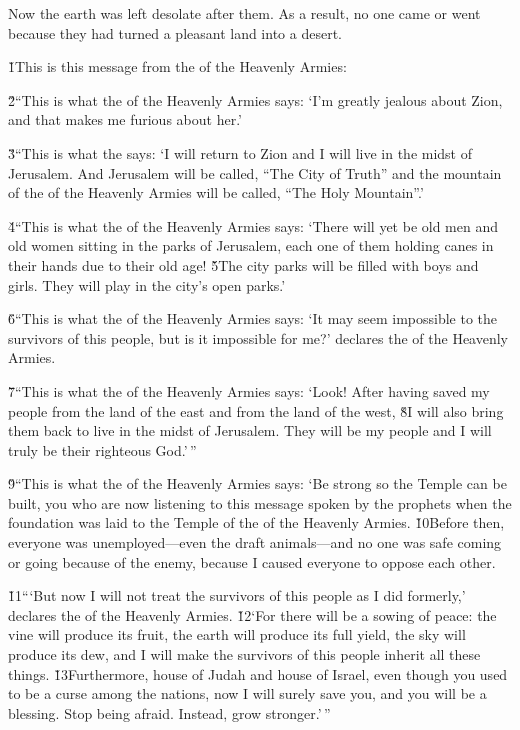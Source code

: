 Now the earth was left desolate after them. As a result, no one came or went because they had turned a pleasant land into a desert.

\v{1}This is this message from the  of the Heavenly Armies:

\v{2}``This is what the  of the Heavenly Armies says: `I'm greatly jealous about Zion, and that makes me furious about her.'

\v{3}``This is what the  says: `I will return to Zion and I will live in the midst of Jerusalem. And Jerusalem will be called, ``The City of Truth'' and the mountain of the  of the Heavenly Armies will be called, ``The Holy Mountain''.'

\v{4}``This is what the  of the Heavenly Armies says: `There will yet be old men and old women sitting in the parks of Jerusalem, each one of them holding canes in their hands due to their old age! \v{5}The city parks will be filled with boys and girls. They will play in the city's open parks.'

\v{6}``This is what the  of the Heavenly Armies says: `It may seem impossible to the survivors of this people, but is it impossible for me?' declares the  of the Heavenly Armies.

\v{7}``This is what the  of the Heavenly Armies says: `Look! After having saved my people from the land of the east and from the land of the west, \v{8}I will also bring them back to live in the midst of Jerusalem. They will be my people and I will truly be their righteous God.'\,''

\v{9}``This is what the  of the Heavenly Armies says: `Be strong so the Temple can be built, you who are now listening to this message spoken by the prophets when the foundation was laid to the Temple of the  of the Heavenly Armies. \v{10}Before then, everyone was unemployed---even the draft animals---and no one was safe coming or going because of the enemy, because I caused everyone to oppose each other.

\v{11}```But now I will not treat the survivors of this people as I did formerly,' declares the  of the Heavenly Armies. \v{12}`For there will be a sowing of peace: the vine will produce its fruit, the earth will produce its full yield, the sky will produce its dew, and I will make the survivors of this people inherit all these things. \v{13}Furthermore, house of Judah and house of Israel, even though you used to be a curse among the nations, now I will surely save you, and you will be a blessing. Stop being afraid. Instead, grow stronger.'\,''

